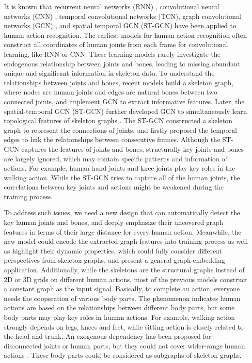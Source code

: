 \documentclass[journal]{IEEEtran}
\begin{document}
It is known that recurrent neural networks (RNN) \cite{liu2018multi,huang2018toward}, convolutional neural networks (CNN) \cite{nie2019view}, temporal convolutional networks (TCN)\cite{kim2017interpretable}, graph convolutional networks (GCN) \cite{yang2020sta}, and spatial temporal GCN (ST-GCN) \cite{yan2018spatial} have been applied to human action recognition. The earliest models for human action recognition often construct all coordinates of human joints from each frame for convolutional learning, like RNN or CNN. These learning models rarely investigate the endogenous relationship between joints and bones, leading to missing abundant unique and significant information in skeleton data. To understand the relationships between joints and bones, recent models build a skeleton graph, where nodes are human joints and edges are natural bones between two connected joints, and implement GCN to extract informative features. Later, the spatial-temporal GCN (ST-GCN) further developed GCN to simultaneously learn topological features of skeleton graphs \cite{yan2018spatial}. The ST-GCN constructed a skeleton graph to represent the connections of joints, and firstly proposed the temporal edges to link the relationships between consecutive frames. Although the ST-GCN captures the features of joints and bones, structurally key joints and bones are largely ignored, which may contain specific patterns and information of actions. For example, human hand joints and knee joints play key roles in the walking action. While the ST-GCN tries to capture all of the human joints, the correlations between key joints and actions might be weakened during the training process.

To address such issues, we need a new design that can automatically detect the key human joints and bones, and deeply emphasize their uncovered graph features in terms of their large distance for every human action. Meanwhile, the new model could encode the extracted graph features into training process as well as highlight their dynamic properties, which could fully consider different perspectives from skeleton graphs, and present a general graph embedding application. Additionally, while the skeletons are the structural graphs instead of 2D or 3D grids on different human actions, most of the previous models construct a constant graph as the input signal. Basically, to complete an action, everyone needs the cooperation of various body parts. The phenomenon indicates human actions are based on the relationships between different body parts, but some body parts may play key roles in human actions. For example, walking action strongly depends on legs, knees and feet, while sitting action is closely related to the head and trunk. An exogenous dependency has been proposed for disconnected joints or human parts, but they could not cover wider-range human actions \cite{zhang2019semantics}. These body parts could be considered as subgraphs of skeleton graphs.
\end{document}
